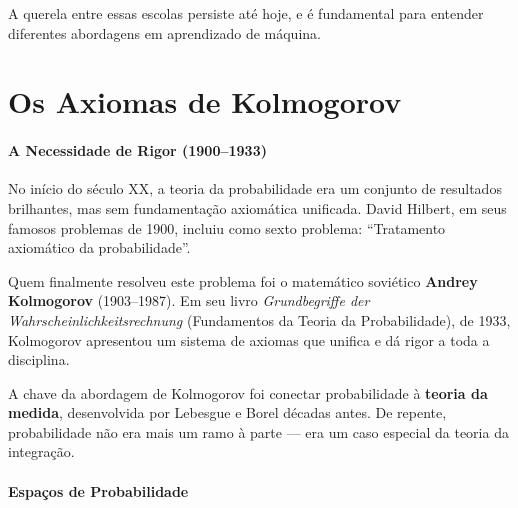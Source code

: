 \documentclass{tufte-handout}
\begin{document}
A querela entre essas escolas persiste até hoje, e é fundamental para entender diferentes
abordagens em aprendizado de máquina.

\section{Os Axiomas de Kolmogorov}

\paragraph{A Necessidade de Rigor (1900--1933)}

No início do século XX, a teoria da probabilidade era um conjunto de resultados brilhantes,
mas sem fundamentação axiomática unificada. David Hilbert, em seus famosos problemas de 1900,
incluiu como sexto problema: ``Tratamento axiomático da probabilidade''.

Quem finalmente resolveu este problema foi o matemático soviético \textbf{Andrey Kolmogorov}
(1903--1987). Em seu livro \textit{Grundbegriffe der Wahrscheinlichkeitsrechnung}
(Fundamentos da Teoria da Probabilidade), de 1933, Kolmogorov apresentou um sistema de
axiomas que unifica e dá rigor a toda a disciplina.

A chave da abordagem de Kolmogorov foi conectar probabilidade à \textbf{teoria da medida},
desenvolvida por Lebesgue e Borel décadas antes. De repente, probabilidade não era mais
um ramo à parte --- era um caso especial da teoria da integração.

\paragraph{Espaços de Probabilidade}
\end{document}
